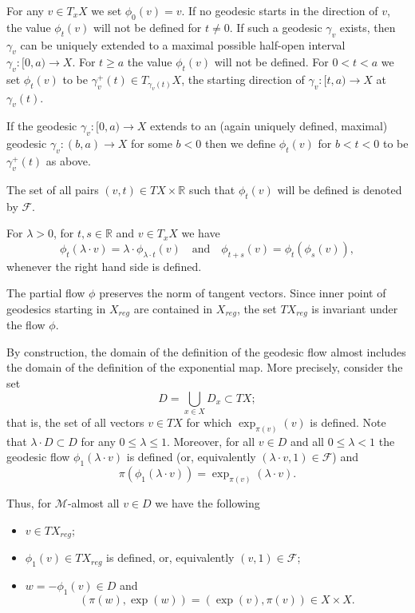 \documentclass[12pt,leqno,intlimits]{amsart}
\numberwithin{equation}{section}
\theoremstyle{definition}
\theoremstyle{remark}
\newcommand{\R}{\mathbb{R}}
\def\:{\colon}
\begin{document}
For any $v\in T_xX$ we set $\phi _0(v)=v$.
If no geodesic starts in the direction of $v$,
the value $\phi _t(v)$ will not be defined for $t\neq 0$. If such a geodesic $\gamma_v$ exists, then $\gamma_v$ can be uniquely extended to a maximal possible half-open interval $\gamma_v \:[0,a)\to X$. For $t\geq a$
the value $\phi _t(v)$ will not be defined. For $0<t<a$ we set $\phi _t(v)$ to be $\gamma _v ^+ (t) \in T_{\gamma _v(t)} X$, the starting direction of $\gamma_v\:[t,a) \to X$ at $\gamma_v (t)$.

If the geodesic $\gamma _v\:[0,a)\to X$ extends to an (again uniquely defined, maximal) geodesic $\gamma_v\:(b,a) \to X$ for some $b<0$
then we define $\phi _t(v)$ for $b<t<0$ to be $\gamma_v ^+ (t) $ as above.

The set of all pairs $(v,t)\in TX\times\R$ such that $\phi_t(v)$ will be defined is denoted by $\mathcal F$.

For $\lambda >0$, for $t,s\in \R$ and $v\in T_x X$ we have
$$\phi _t(\lambda \cdot v) =\lambda \cdot \phi _{\lambda \cdot t} (v)
\quad\text{and}\quad
\phi _{t+s} (v) =\phi _t ( \phi _s (v)),$$
whenever the right hand side is defined.

The partial flow $\phi$ preserves the norm of tangent vectors. Since inner point of geodesics starting in $X_{reg}$ are contained in $X_{reg}$, the set $TX_{reg}$ is invariant under the flow $\phi$.

By construction, the domain of the definition of the geodesic flow almost includes the domain of the definition of the exponential map.
More precisely, consider the set
\[D=\bigcup_{x\in X} D_x\subset TX;\]
that is, the set of all vectors $v\in TX$ for which $\exp _{\pi(v)} (v)$ is defined.
Note that $\lambda\cdot D\subset D$ for any $0\leq \lambda \leq 1$.
Moreover, for all $v\in D$ and all $0\leq \lambda <1$
the geodesic flow $\phi_1(\lambda\cdot v)$ is defined (or, equivalently $(\lambda\cdot v,1)\in \mathcal F$) and
\[\pi(\phi_1 (\lambda\cdot  v))= \exp _{\pi (v)} (\lambda\cdot  v).\]


Thus, for $\mathcal M$-almost all $v\in D$ we have the following
\begin{itemize}
\item $v\in TX_{reg}$;
\item $\phi _1(v) \in TX_{reg}$ is defined, or, equivalently $(v,1)\in \mathcal F$;
\item $w=-\phi_1 (v)\in D$ and
\begin{equation} \label{eq:symm}
(\pi (w), \exp (w))=(\exp (v), \pi (v)) \in X\times X.
\end{equation}
\end{itemize}
\end{document}
